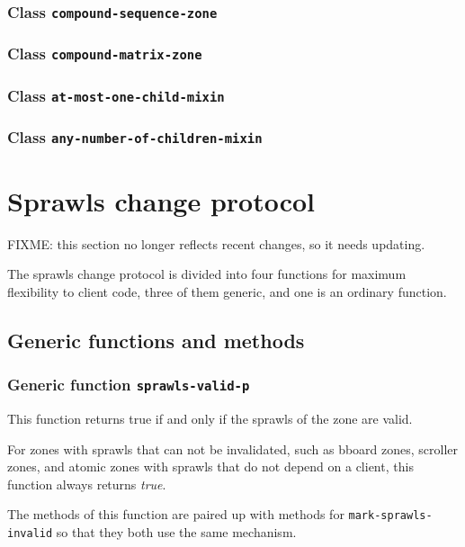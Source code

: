\documentclass{report}
\begin{document}
\subsubsection{Class \texttt{compound-sequence-zone}}

\subsubsection{Class \texttt{compound-matrix-zone}}

\subsubsection{Class \texttt{at-most-one-child-mixin}}

\subsubsection{Class \texttt{any-number-of-children-mixin}}


\section{Sprawls change protocol}

FIXME: this section no longer reflects recent changes, so it needs
updating.

The sprawls change protocol is divided into four functions for maximum
flexibility to client code, three of them generic, and one is an
ordinary function.

\subsection{Generic functions and methods}

\subsubsection{Generic function \texttt{sprawls-valid-p}}
\label{generic-function-sprawls-valid-p}

This function returns true if and only if the sprawls of the zone are
valid.  

For zones with sprawls that can not be invalidated, such as bboard
zones, scroller zones, and atomic zones with sprawls that do not depend
on a client, this function always returns \emph{true}.

The methods of this function are paired up with methods for
\texttt{mark-sprawls-invalid} so that they both use the same mechanism. 
\end{document}
